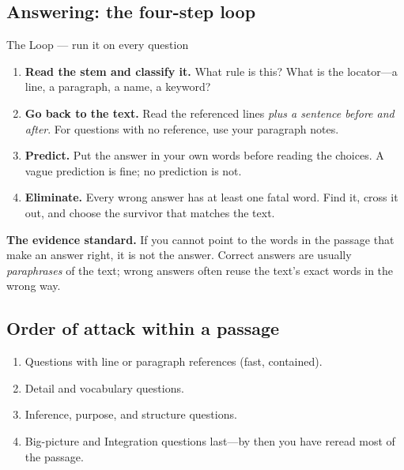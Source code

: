 \documentclass[11pt]{article}
\begin{document}
\subsection{Answering: the four-step loop}
\begin{rulebox}{The Loop --- run it on every question}
\begin{enumerate}[leftmargin=1.6em]
  \item \textbf{Read the stem and classify it.} What rule is this? What is the locator---a line, a paragraph, a name, a keyword?
  \item \textbf{Go back to the text.} Read the referenced lines \emph{plus a sentence before and after}. For questions with no reference, use your paragraph notes.
  \item \textbf{Predict.} Put the answer in your own words before reading the choices. A vague prediction is fine; no prediction is not.
  \item \textbf{Eliminate.} Every wrong answer has at least one fatal word. Find it, cross it out, and choose the survivor that matches the text.
\end{enumerate}
\end{rulebox}

\textbf{The evidence standard.} If you cannot point to the words in the passage that make an answer right, it is not the answer. Correct answers are usually \emph{paraphrases} of the text; wrong answers often reuse the text's exact words in the wrong way.

\subsection{Order of attack within a passage}
\begin{enumerate}
  \item Questions with line or paragraph references (fast, contained).
  \item Detail and vocabulary questions.
  \item Inference, purpose, and structure questions.
  \item Big-picture and Integration questions last---by then you have reread most of the passage.
\end{enumerate}
\end{document}
